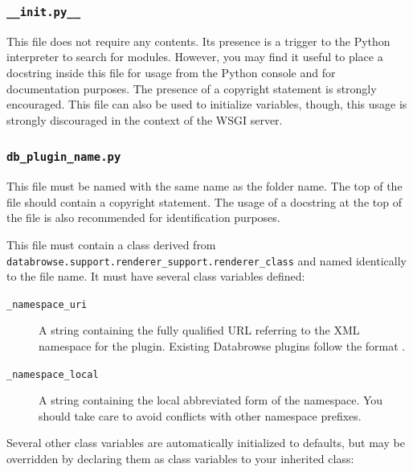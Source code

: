 \documentclass[10pt]{article}
\begin{document}
\subsubsection{\texttt{\_\_init.py\_\_}}
This file does not require any contents.  Its presence is a trigger to the Python interpreter to search for modules.  However, you may find it useful to place a docstring inside this file for usage from the Python console and for documentation purposes.  The presence of a copyright statement is strongly encouraged.  This file can also be used to initialize variables, though, this usage is strongly discouraged in the context of the WSGI server.

\subsubsection{\texttt{db\_plugin\_name.py}}
This file must be named with the same name as the folder name.  The top of the file should contain a copyright statement.  The usage of a docstring at the top of the file is also recommended for identification purposes.  

This file must contain a class derived from \texttt{databrowse.support.renderer\_support.renderer\_class} and named identically to the file name.  It must have several class variables defined:

\begin{description}
	\item[\texttt{\_namespace\_uri}] A string containing the fully qualified URL referring to the XML namespace for the plugin.  Existing Databrowse plugins follow the format .
	\item[\texttt{\_namespace\_local}] A string containing the local abbreviated form of the namespace.  You should take care to avoid conflicts with other namespace prefixes.
\end{description}

Several other class variables are automatically initialized to defaults, but may be overridden by declaring them as class variables to your inherited class:
\end{document}
